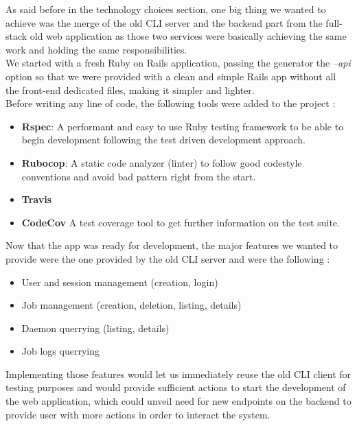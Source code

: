 \documentclass{eplmastersthesis}
\begin{document}
        As said before in the technology choices section, one big thing
        we wanted to achieve was the merge of the old CLI server and
        the backend part from the full-stack old web application as those two
        services were basically achieving the same work and holding the
        same responsibilities.\\

        We started with a fresh Ruby on Rails application, passing the
        generator the \textit{--api} option so that we were provided with
        a clean and simple Rails app without all the front-end dedicated
        files, making it simpler and lighter.\\

        Before writing any line of code, the following tools were added
        to the project :

        \begin{itemize}
          \item \textbf{Rspec}: A performant and easy to use Ruby testing
          framework to be able to begin development following the test
          driven development approach.
          \item \textbf{Rubocop}: A static code analyzer (linter) to follow
          good codestyle conventions and avoid bad pattern right from the start.
          \item \textbf{Travis}
          \item \textbf{CodeCov} A test coverage tool to get further
          information on the test suite.
        \end{itemize}

        Now that the app was ready for development, the major features
        we wanted to provide were the one provided by the old CLI server and
        were the following :

        \begin{itemize}
          \item User and session management (creation, login)
          \item Job management (creation, deletion, listing, details)
          \item Daemon querrying (listing, details)
          \item Job logs querrying
        \end{itemize}

        Implementing those features would let us immediately reuse the old
        CLI client for testing purposes and would provide sufficient actions
        to start the development of the web application, which could unveil
        need for new endpoints on the backend to provide user with more
        actions in order to interact the system.\\
\end{document}
